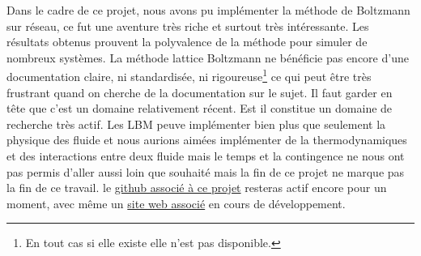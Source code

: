 Dans le cadre de ce projet, nous avons pu implémenter la méthode de Boltzmann sur réseau, ce fut une aventure très riche
et surtout très intéressante.
Les résultats obtenus prouvent la polyvalence de la méthode pour simuler de nombreux systèmes.
La méthode lattice Boltzmann ne bénéficie pas encore d'une documentation claire, ni standardisée, ni rigoureuse\footnote{En tout cas si elle existe elle n'est pas disponible.}  
ce qui peut être très frustrant quand on cherche de la documentation sur le sujet. Il faut garder en tête que c'est un domaine relativement récent. Est il constitue un domaine de recherche très actif.
Les LBM peuve implémenter bien plus que seulement la physique des fluide et nous aurions aimées implémenter de la thermodynamiques et des interactions entre deux fluide mais le temps et la contingence ne nous ont pas permis d'aller aussi loin que souhaité mais la fin de ce projet ne marque pas la fin de ce travail. le \href{https://github.com/Pacidus/LBM_project}{github associé à ce projet} resteras actif encore pour un moment, avec même un \href{https://pacidus.github.io/LBM_project/}{site web associé} en cours de développement. 
